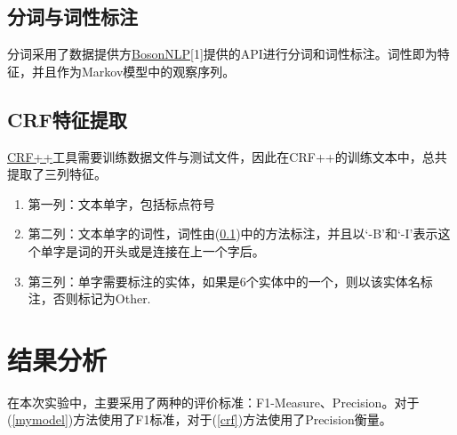 \documentclass[11pt]{article}
\begin{document}
\subsection{分词与词性标注}\label{aaa}
\hspace{1.6em} 分词采用了数据提供方\href{http://bosonnlp.com}{BosonNLP}[1]提供的API进行分词和词性标注。词性即为特征，并且作为Markov模型中的观察序列。
\subsection{CRF特征提取}\label{bbb}
\hspace{1.6em} \href{http://sourceforge.net/projects/crfpp/}{CRF++}工具需要训练数据文件与测试文件，因此在CRF++的训练文本中，总共提取了三列特征。
\begin{enumerate}
\setlength{\itemsep}{-5pt}
  \item 第一列：文本单字，包括标点符号
  \item 第二列：文本单字的词性，词性由(\ref{aaa})中的方法标注，并且以‘-B’和‘-I’表示这个单字是词的开头或是连接在上一个字后。
  \item 第三列：单字需要标注的实体，如果是6个实体中的一个，则以该实体名标注，否则标记为Other.
\end{enumerate}
\section{结果分析}
\hspace{1.6em} 在本次实验中，主要采用了两种的评价标准：F1-Measure、Precision。对于(\ref{mymodel})方法使用了F1标准，对于(\ref{crf})方法使用了Precision衡量。
\end{document}
